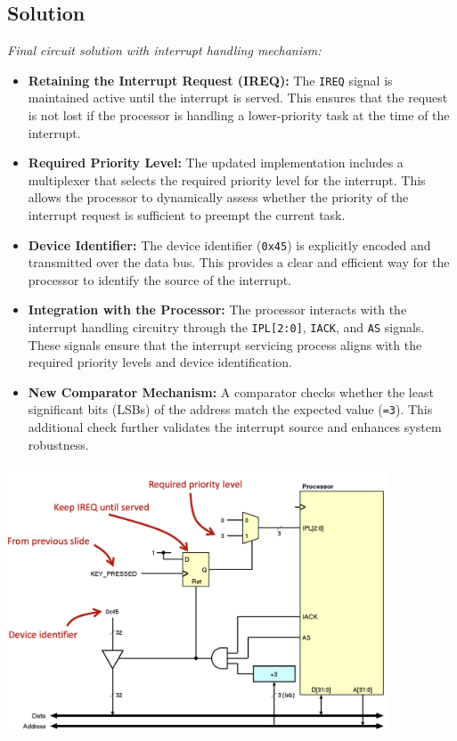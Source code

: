 \subsection{Solution}
\textit{Final circuit solution with interrupt handling mechanism:} \\
\vspace{10px}
\begin{minipage}[htp]{0.40\textwidth}
    \footnotesize
    \begin{itemize}
        \item \textbf{Retaining the Interrupt Request (IREQ):} 
        The \texttt{IREQ} signal is maintained active until the interrupt is served. This ensures that the request is not lost if the processor is handling a lower-priority task at the time of the interrupt.
    
        \item \textbf{Required Priority Level:} 
        The updated implementation includes a multiplexer that selects the required priority level for the interrupt. This allows the processor to dynamically assess whether the priority of the interrupt request is sufficient to preempt the current task.
    
        \item \textbf{Device Identifier:} 
        The device identifier (\texttt{0x45}) is explicitly encoded and transmitted over the data bus. This provides a clear and efficient way for the processor to identify the source of the interrupt.
    
        \item \textbf{Integration with the Processor:} 
        The processor interacts with the interrupt handling circuitry through the \texttt{IPL[2:0]}, \texttt{IACK}, and \texttt{AS} signals. These signals ensure that the interrupt servicing process aligns with the required priority levels and device identification.
    
        \item \textbf{New Comparator Mechanism:} 
        A comparator checks whether the least significant bits (LSBs) of the address match the expected value (\texttt{=3}). This additional check further validates the interrupt source and enhances system robustness.
    \end{itemize}
\end{minipage}
\hfill
\vline
\hfill
\begin{minipage}[htp]{0.55\textwidth}
    \begin{center}
        \includegraphics[width=0.85\textwidth]{chapters/chapter2e/images/circuit3.png}
    \end{center}
\end{minipage}

